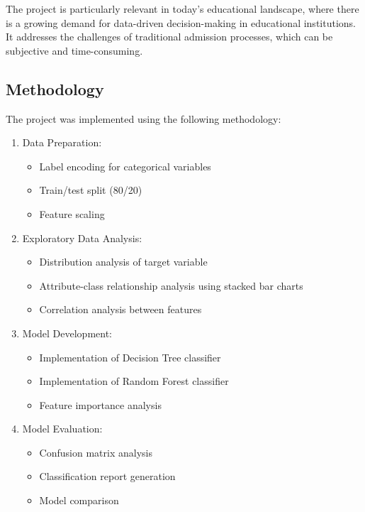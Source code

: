 The project is particularly relevant in today's educational landscape, where there is a growing demand for data-driven decision-making in educational institutions. It addresses the challenges of traditional admission processes, which can be subjective and time-consuming.

\subsection{Methodology}
The project was implemented using the following methodology:

\begin{enumerate}
    \item Data Preparation:
    \begin{itemize}
        \item Label encoding for categorical variables
        \item Train/test split (80/20)
        \item Feature scaling
    \end{itemize}
    
    \item Exploratory Data Analysis:
    \begin{itemize}
        \item Distribution analysis of target variable
        \item Attribute-class relationship analysis using stacked bar charts
        \item Correlation analysis between features
    \end{itemize}
    
    \item Model Development:
    \begin{itemize}
        \item Implementation of Decision Tree classifier
        \item Implementation of Random Forest classifier
        \item Feature importance analysis
    \end{itemize}
    
    \item Model Evaluation:
    \begin{itemize}
        \item Confusion matrix analysis
        \item Classification report generation
        \item Model comparison
    \end{itemize}
\end{enumerate}

